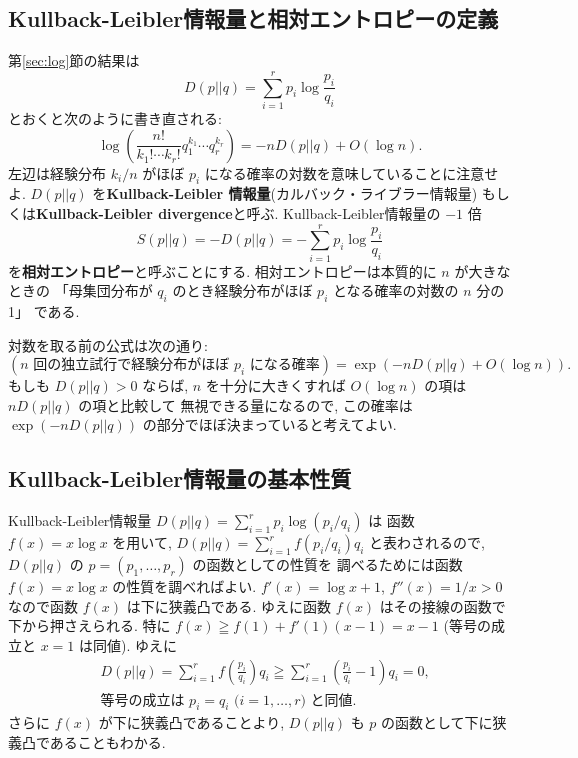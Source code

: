 \documentclass[12pt,twoside]{jarticle}
\theoremstyle{jplain}
\theoremstyle{jplain}
\theoremstyle{jplain}
\numberwithin{theorem}{section}
\numberwithin{equation}{section}
\numberwithin{figure}{section}
\numberwithin{table}{section}
\newcommand\secref[1]{第\ref{#1}節}
\begin{document}

\subsection{Kullback-Leibler情報量と相対エントロピーの定義}

\secref{sec:log}の結果は
\[
D(p||q)=\sum_{i=1}^r p_i\log\frac{p_i}{q_i}
\]
とおくと次のように書き直される:
\[
\log\left(\frac{n!}{k_1!\cdots k_r!} q_1^{k_1}\cdots q_r^{k_r}\right)
=-n D(p||q) + O(\log n).
\]
左辺は経験分布 $k_i/n$ がほぼ $p_i$ になる確率の対数を意味していることに注意せよ.
$D(p||q)$ を{\bfseries Kullback-Leibler 情報量}(カルバック・ライブラー情報量)
もしくは{\bfseries Kullback-Leibler divergence}と呼ぶ.
Kullback-Leibler情報量の $-1$ 倍
\[
S(p||q) = -D(p||q) = - \sum_{i=1}^r p_i\log\frac{p_i}{q_i}
\]
を{\bfseries 相対エントロピー}と呼ぶことにする.
相対エントロピーは本質的に $n$ が大きなときの
「母集団分布が $q_i$ のとき経験分布がほぼ $p_i$ となる確率の対数の $n$ 分の1」
である.

対数を取る前の公式は次の通り:
\[
(\text{$n$ 回の独立試行で経験分布がほぼ $p_i$ になる確率})
=\exp(-n D(p||q) + O(\log n)).
\]
もしも $D(p||q)>0$ ならば,
$n$ を十分に大きくすれば $O(\log n)$ の項は $n D(p||q)$ の項と比較して
無視できる量になるので,
この確率は $\exp(-n D(p||q))$ の部分でほぼ決まっていると考えてよい.


\subsection{Kullback-Leibler情報量の基本性質}
\label{sec:KL-prop}

Kullback-Leibler情報量 $D(p||q)=\sum_{i=1}^r p_i\log(p_i/q_i)$ は
函数 $f(x)=x\log x$ を用いて,
$D(p||q)=\sum_{i=1}^r f(p_i/q_i)q_i$ と表わされるので,
$D(p||q)$ の $p=(p_1,\ldots,p_r)$ の函数としての性質を
調べるためには函数 $f(x)=x\log x$ の性質を調べればよい.
$f'(x)=\log x + 1$, $f''(x)=1/x>0$ なので函数 $f(x)$ は下に狭義凸である.
ゆえに函数 $f(x)$ はその接線の函数で下から押さえられる.
特に $f(x)\geqq f(1)+f'(1)(x-1)=x-1$ (等号の成立と $x=1$ は同値).
ゆえに
\begin{align*}
&
D(p||q)
=\sum_{i=1}^r f\left(\frac{p_i}{q_i}\right)q_i
\geqq \sum_{i=1}^r\left(\frac{p_i}{q_i}-1\right)q_i
=0,
\\ &
\text{等号の成立は $p_i=q_i$ ($i=1,\ldots,r$) と同値.}
\end{align*}
さらに $f(x)$ が下に狭義凸であることより,
$D(p||q)$ も $p$ の函数として下に狭義凸であることもわかる.
\end{document}
